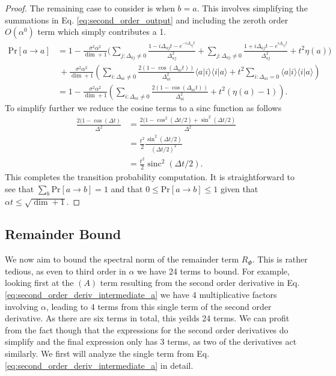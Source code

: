 \documentclass{article}
\newcommand{\braket}[2]{\langle #1|#2\rangle}
\newcommand{\parens}[1]{\left( #1 \right)}
\newcommand{\prob}[1]{\text{Pr}\left[ #1 \right]}
\newcommand{\bigo}[1]{O\left( #1 \right)}
\DeclareMathOperator{\sinc}{sinc}
\begin{document}
\begin{proof}
    The remaining case to consider is when $b = a$. This involves simplifying the summations in Eq. \eqref{eq:second_order_output} and including the zeroth order $\bigo{\alpha^0}$ term which simply contributes a 1. 
    \begin{align}
        \prob{a \to a} &= 1 -\frac{\sigma^2 \alpha^2 }{\dim + 1} \bigg(\sum_{j: \Delta_{aj} \neq 0} \frac{1 - i \Delta_{aj}t - e^{-i \Delta_{aj} t}}{\Delta_{aj}^2} + \sum_{j: \Delta_{aj} \neq 0} \frac{1 + i \Delta_{aj} t - e^{i \Delta_{aj} t}}{\Delta_{aj}^2} + t^2 \eta(a) \bigg) \nonumber \\
    &~ +\frac{\sigma^2 \alpha^2 }{\dim+1} \parens{ \sum_{i: \Delta_{ai} \neq 0 } \frac{2(1- \cos (\Delta_{ai}t))}{\Delta_{ai}^2} \braket{a}{i} \braket{i}{a} + t^2  \sum_{i : \Delta_{ai} = 0} \braket{a}{i} \braket{i}{a}} \\
    &= 1 - \frac{\sigma^2 \alpha^2}{\dim + 1} \parens{\sum_{i: \Delta_{ai} \neq 0} \frac{2(1 - \cos(\Delta_{ai}t))}{\Delta_{ai}^2} + t^2 (\eta(a) - 1)}.
    \end{align}
    To simplify further we reduce the cosine terms to a sinc function as follows
    \begin{align}
        \frac{2(1 - \cos(\Delta t)}{\Delta^2} &= \frac{2(1 - \cos^2(\Delta t / 2) + \sin^2(\Delta t /2)}{\Delta^2} \\
        &= \frac{t^2}{2} \frac{\sin^2 (\Delta t / 2)}{ (\Delta t/ 2)^2} \\
        &= \frac{t^2}{2} \sinc^2(\Delta t /2).
    \end{align}
    This completes the transition probability computation. It is straightforward to see that $\sum_{b} \prob{a \to b} = 1$ and that $0 \leq \prob{a \to b} \leq 1$ given that $\alpha t \leq \sqrt{\dim + 1}$.
\end{proof}

\subsection{Remainder Bound}
We now aim to bound the spectral norm of the remainder term $R_{\Phi}$. This is rather tedious, as even to third order in $\alpha$ we have 24 terms to bound. For example, looking first at the $(A)$ term resulting from the second order derivative in Eq. \eqref{eq:second_order_deriv_intermediate_a} we have 4 multiplicative factors involving $\alpha$, leading to 4 terms from this single term of the second order derivative. As there are six terms in total, this yeilds 24 terms. We can profit from the fact though that the expressions for the second order derivatives do simplify and the final expression only has 3 terms, as two of the derivatives act similarly. We first will analyze the single term from Eq. \eqref{eq:second_order_deriv_intermediate_a} in detail. 
\end{document}
